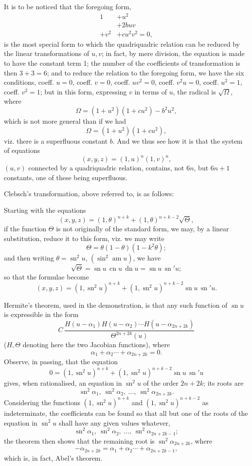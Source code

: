 \documentclass[11pt,a4paper]{article}
\newcommand{\sn}{\operatorname{sn}}
\newcommand{\cn}{\operatorname{cn}}
\newcommand{\dn}{\operatorname{dn}}
\begin{document}
It is to be noticed that the foregoing form,
\[
\begin{matrix}
1&+u^2\\
&+2buv\\
+v^2&+cu^2v^2=0,
\end{matrix}
\]
is the most special form to which the quadriquadric relation can be reduced by the linear
transformations of $u,v$; in fact, by mere division, the equation is made to have the constant
term 1; the number of the coefficients of transformation is then $3+3=6$; and to reduce the
relation to the foregoing form, we have the six conditions, coeff. $u=0$, coeff. $v=0$,
coeff. $uv^2=0$, coeff. $v^2u=0$, coeff. $u^2=1$, coeff. $v^2=1$; but in this form,
expressing $v$ in terms of $u$, the radical is $\sqrt\Omega$, where
\[
 \Omega=(1+u^2)(1+cu^2)-b^2u^2,
\]
which is not more general than if we had
\[
 \Omega=(1+u^2)(1+cu^2),
\]
viz. there is a superfluous constant $b$. And we thus see how it is that the system of
equations
\[
 (x,y,z)=(1,u)^n(1,v)^n,
\]
$(u,v)$ connected by a quadriquadric relation, contains, not $6n$, but $6n+1$ constants,
one of these being superfluous.

Clebsch's transformation, above referred to, is as follows:

Starting with the equations
\[
 (x,y,z)=(1,\theta)^{n+k}+(1,\theta)^{n+k-2}\sqrt\Theta,
\]
if the function $\Theta$ is not originally of the standard form, we may, by a linear
substitution, reduce it to this form, viz. we may write
\[
 \Theta=\theta(1-\theta)(1-k^2\theta);
\]
and then writing $\theta=\sn^2u$, $(\sin^2\operatorname{am}u)$, we have
\[
 \sqrt\Theta=\sn u\,\cn u\,\dn u=\sn u\,\sn' u;
\]
so that the formulae become
\[
 (x,y,z)=(1,\sn^2u)^{n+k}+(1,\sn^2u)^{n+k-2}\sn u\,\sn' u.
\]

Hermite's theorem, used in the demonstration, is that any such function of $\sn u$ is
expressible in the form
\[
 C\,\frac{H(u-\alpha_1)H(u-\alpha_2)\cdots H(u-\alpha_{2n+2k})}{\Theta^{2n+2k}(u)}
\]
($H,\Theta$ denoting here the two Jacobian functions), where
\[
 \alpha_1+\alpha_2\cdots+\alpha_{2n+2k}=0.
\]
Observe, in passing, that the equation
\[
 0=(1,\sn^2u)^{n+k}+(1,\sn^2u)^{n+k-2}\sn u\,\sn' u
\]
gives, when rationalised, an equation in $\sn^2u$ of the order $2n+2k$; its roots are
\[
 \sn^2\alpha_1,\ \sn^2\alpha_2,\ \ldots,\ \sn^2\alpha_{2n+2k}.
\]
Considering the
functions $(1,\sn^2u)^{n+k}$ and $(1,\sn^2u)^{n+k-2}$ as indeterminate, the coefficients can
be found so that all but one of the roots of the equation in $\sn^2u$ shall have any given
values whatever,
\[
 \sn^2\alpha_1,\ \sn^2\alpha_2,\ \ldots,\ \sn^2\alpha_{2n+2k-1};
\]
the theorem then
shows that the remaining root is $\sn^2\alpha_{2n+2k}$, where
\[
 -\alpha_{2n+2k}=\alpha_1+\alpha_2\cdots+\alpha_{2n+2k-1},
\]
which is, in fact, Abel's theorem.
\end{document}
